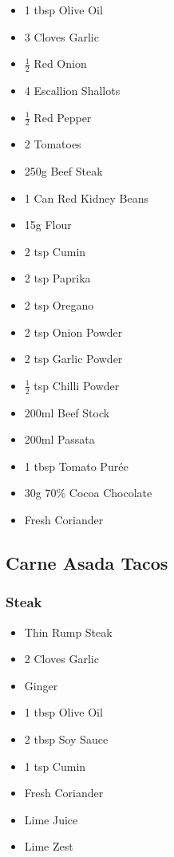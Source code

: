 \documentclass[11pt, english]{article}
\begin{document}
	\begin{itemize}
	\setlength\itemsep{0cm}
		\item 1 tbsp Olive Oil
		\item 3 Cloves Garlic
		\item $\frac{1}{2}$ Red Onion
		\item 4 Escallion Shallots
		\item $\frac{1}{2}$ Red Pepper
		\item 2 Tomatoes
		\item 250g Beef Steak
		\item 1 Can Red Kidney Beans
		\item 15g Flour
		\item 2 tsp Cumin
		\item 2 tsp Paprika
		\item 2 tsp Oregano
		\item 2 tsp Onion Powder
		\item 2 tsp Garlic Powder
		\item $\frac{1}{2}$ tsp Chilli Powder
		\item 200ml Beef Stock
		\item 200ml Passata
		\item 1 tbsp Tomato Pur\'{e}e
		\item 30g 70\% Cocoa Chocolate
		\item Fresh Coriander
	\end{itemize}

\newpage

	\subsection{Carne Asada Tacos}

		\subsubsection*{Steak}

	\begin{itemize}
        \setlength\itemsep{0cm}
		\item Thin Rump Steak
		\item 2 Cloves Garlic
		\item Ginger
		\item 1 tbsp Olive Oil
		\item 2 tbsp Soy Sauce
		\item 1 tsp Cumin
		\item Fresh Coriander
		\item Lime Juice
		\item Lime Zest
	\end{itemize}
\end{document}

